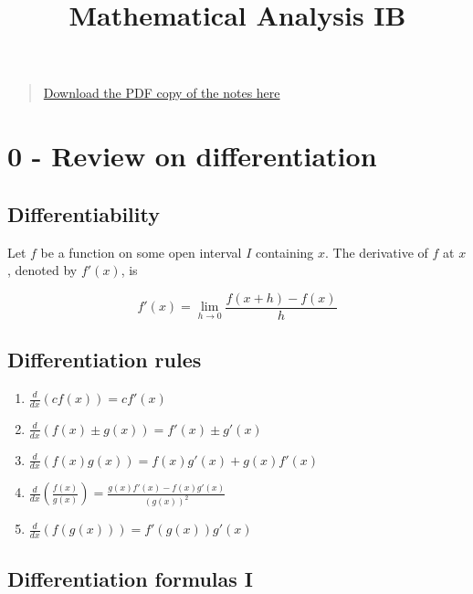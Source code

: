 \documentclass[
]{article}
\title{Mathematical Analysis IB}
\author{}
\date{\vspace{-2.5em}}
\begin{document}
\maketitle

\begin{quote}
\href{../math-31.2/notes.pdf}{Download the PDF copy of the notes here}
\end{quote}

\hypertarget{review-on-differentiation}{%
\section*{0 - Review on
differentiation}\label{review-on-differentiation}}

\hypertarget{differentiability}{%
\subsection{Differentiability}\label{differentiability}}

Let \(f\) be a function on some open interval \(I\) containing \(x\).
The derivative of \(f\) at \(x\), denoted by \(f'(x)\), is

\[ f'(x) = \lim_{h\to 0}\frac{f(x+h)-f(x)}{h} \]

\hypertarget{differentiation-rules}{%
\subsection{Differentiation rules}\label{differentiation-rules}}

\begin{enumerate}
\def\labelenumi{\arabic{enumi}.}
\item
  \(\frac{d}{dx}(cf(x))= cf'(x)\)
\item
  \(\frac{d}{dx}(f(x) \pm g(x)) = f'(x) \pm g'(x)\)
\item
  \(\frac{d}{dx}(f(x)g(x)) = f(x)g'(x) + g(x)f'(x)\)
\item
  \(\frac{d}{dx}(\frac{f(x)}{g(x)}) = \frac{g(x)f'(x)-f(x)g'(x)}{(g(x))^2}\)
\item
  \(\frac{d}{dx}(f(g(x))) = f'(g(x))g'(x)\)
\end{enumerate}

\hypertarget{differentiation-formulas-i}{%
\subsection{Differentiation formulas
I}\label{differentiation-formulas-i}}
\end{document}
